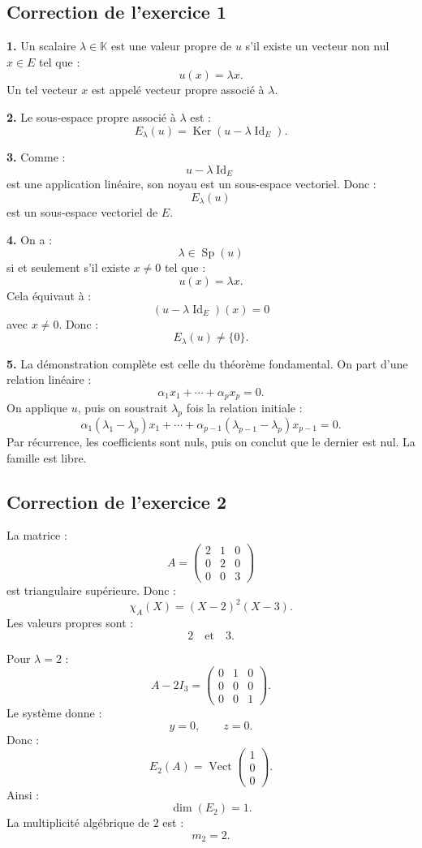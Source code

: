 \documentclass[11pt,a4paper]{article}
\newcommand{\K}{\mathbb K}
\newcommand{\Vect}{\operatorname{Vect}}
\newcommand{\Ker}{\operatorname{Ker}}
\newcommand{\Id}{\operatorname{Id}}
\newcommand{\Sp}{\operatorname{Sp}}
\begin{document}
\subsection*{Correction de l'exercice 1}

\textbf{1.}  
Un scalaire \(\lambda\in\K\) est une valeur propre de \(u\) s'il existe un vecteur non nul \(x\in E\) tel que :
\[
u(x)=\lambda x.
\]
Un tel vecteur \(x\) est appelé vecteur propre associé à \(\lambda\).

\textbf{2.}  
Le sous-espace propre associé à \(\lambda\) est :
\[
E_\lambda(u)=\Ker(u-\lambda\Id_E).
\]

\textbf{3.}  
Comme :
\[
u-\lambda\Id_E
\]
est une application linéaire, son noyau est un sous-espace vectoriel.  
Donc :
\[
E_\lambda(u)
\]
est un sous-espace vectoriel de \(E\).

\textbf{4.}  
On a :
\[
\lambda\in\Sp(u)
\]
si et seulement s'il existe \(x\neq0\) tel que :
\[
u(x)=\lambda x.
\]
Cela équivaut à :
\[
(u-\lambda\Id_E)(x)=0
\]
avec \(x\neq0\).  
Donc :
\[
E_\lambda(u)\neq\{0\}.
\]

\textbf{5.}  
La démonstration complète est celle du théorème fondamental.  
On part d'une relation linéaire :
\[
\alpha_1x_1+\cdots+\alpha_px_p=0.
\]
On applique \(u\), puis on soustrait \(\lambda_p\) fois la relation initiale :
\[
\alpha_1(\lambda_1-\lambda_p)x_1+\cdots+\alpha_{p-1}(\lambda_{p-1}-\lambda_p)x_{p-1}=0.
\]
Par récurrence, les coefficients sont nuls, puis on conclut que le dernier est nul.  
La famille est libre.

\subsection*{Correction de l'exercice 2}

La matrice :
\[
A=
\begin{pmatrix}
2&1&0\\
0&2&0\\
0&0&3
\end{pmatrix}
\]
est triangulaire supérieure.  
Donc :
\[
\chi_A(X)=(X-2)^2(X-3).
\]
Les valeurs propres sont :
\[
2
\quad\text{et}\quad
3.
\]

Pour \(\lambda=2\) :
\[
A-2I_3=
\begin{pmatrix}
0&1&0\\
0&0&0\\
0&0&1
\end{pmatrix}.
\]
Le système donne :
\[
y=0,
\qquad
z=0.
\]
Donc :
\[
E_2(A)=\Vect
\begin{pmatrix}
1\\0\\0
\end{pmatrix}.
\]
Ainsi :
\[
\dim(E_2)=1.
\]
La multiplicité algébrique de \(2\) est :
\[
m_2=2.
\]
\end{document}

